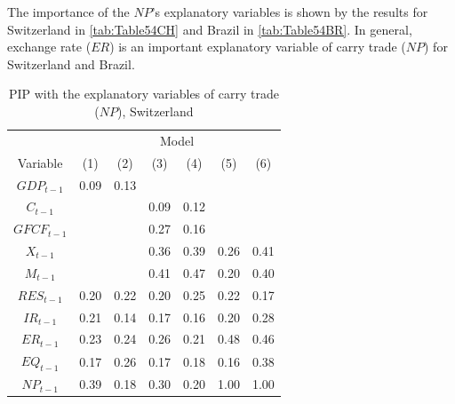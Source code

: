 \documentclass[a4paper, twoside]{templates/ociamthesis}
\begin{document}
The importance of the \(NP\)'s explanatory variables is shown by the results for Switzerland in \ref{tab:Table54CH} and Brazil in \ref{tab:Table54BR}. In general, exchange rate (\(ER\)) is an important explanatory variable of carry trade (\(NP\)) for Switzerland and Brazil.

\begin{table}[!ht]

\caption{\label{tab:Table55CH}PIP with the explanatory variables of carry trade ($NP$), Switzerland}
\centering
\fontsize{9}{11}\selectfont
\begin{tabular}[t]{ccccccc}
\toprule
\multicolumn{1}{c}{ } & \multicolumn{6}{c}{Model} \\
\cmidrule(l{3pt}r{3pt}){2-7}
Variable & (1) & (2) & (3) & (4) & (5) & (6)\\
\midrule
$GDP_{t-1}$ & 0.09 & 0.13 &  &  &  & \\
$C_{t-1}$ &  &  & 0.09 & 0.12 &  & \\
$GFCF_{t-1}$ &  &  & 0.27 & 0.16 &  & \\
$X_{t-1}$ &  &  & 0.36 & 0.39 & 0.26 & 0.41\\
$M_{t-1}$ &  &  & 0.41 & 0.47 & 0.20 & 0.40\\
$RES_{t-1}$ & 0.20 & 0.22 & 0.20 & 0.25 & 0.22 & 0.17\\
$IR_{t-1}$ & 0.21 & 0.14 & 0.17 & 0.16 & 0.20 & 0.28\\
$ER_{t-1}$ & 0.23 & 0.24 & 0.26 & 0.21 & 0.48 & 0.46\\
$EQ_{t-1}$ & 0.17 & 0.26 & 0.17 & 0.18 & 0.16 & 0.38\\
$NP_{t-1}$ & 0.39 & 0.18 & 0.30 & 0.20 & 1.00 & 1.00\\
\bottomrule
\end{tabular}
\end{table}
\end{document}
